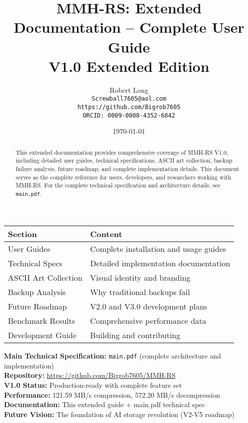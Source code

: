 \documentclass[11pt,a4paper]{article}
\title{MMH-RS: Extended Documentation -- Complete User Guide\\[1ex]\textbf{\large V1.0 Extended Edition}}
\author{Robert Long \\ \texttt{Screwball7605@aol.com} \\ \texttt{https://github.com/Bigrob7605} \\ \texttt{ORCID: 0009-0008-4352-6842}}
\date{\today}
\begin{document}
	\maketitle
	\thispagestyle{empty}
	\begin{abstract}
		This extended documentation provides comprehensive coverage of MMH-RS V1.0, including detailed user guides, technical specifications, ASCII art collection, backup failure analysis, future roadmap, and complete implementation details. This document serves as the complete reference for users, developers, and researchers working with MMH-RS. For the complete technical specification and architecture details, see \texttt{main.pdf}.
	\end{abstract}

	\begin{center}
	\begin{tcolorbox}[colback=gray!5, colframe=gray!60, boxrule=0.7pt, arc=2pt, title=\textbf{\large MMH-RS Extended Documentation Contents}]
	\begin{tabular}{@{}ll@{}}
	\toprule
	\textbf{Section} & \textbf{Content} \\
	\midrule
	User Guides & Complete installation and usage guides \\
	Technical Specs & Detailed implementation documentation \\
	ASCII Art Collection & Visual identity and branding \\
	Backup Analysis & Why traditional backups fail \\
	Future Roadmap & V2.0 and V3.0 development plans \\
	Benchmark Results & Comprehensive performance data \\
	Development Guide & Building and contributing \\
	\bottomrule
	\end{tabular}
	\end{tcolorbox}
	\end{center}

	\begin{calloutbox}
	\textbf{Main Technical Specification:} \texttt{main.pdf} (complete architecture and implementation) \\
	\textbf{Repository:} \url{https://github.com/Bigrob7605/MMH-RS} \\
	\textbf{V1.0 Status:} Production-ready with complete feature set \\
	\textbf{Performance:} 121.59 MB/s compression, 572.20 MB/s decompression \\
	\textbf{Documentation:} This extended guide + main.pdf technical spec \\
	\textbf{Future Vision:} The foundation of AI storage revolution (V2-V5 roadmap)
	\end{calloutbox}
	
\end{document}
